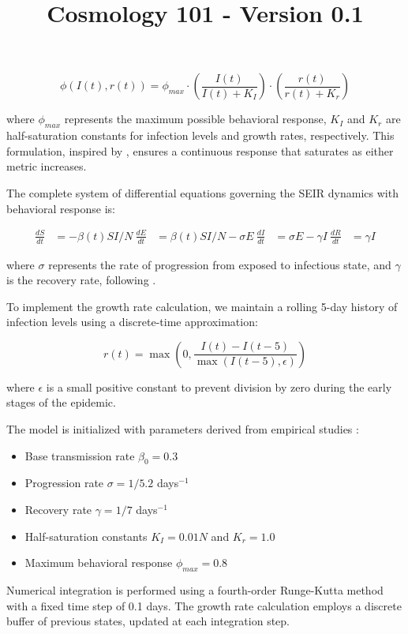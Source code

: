 \documentclass{article}\usepackage{graphicx} \usepackage{amsmath} \usepackage{colortbl}\title{Cosmology 101 - Version 0.1}
\begin{document}
\begin{equation}
\phi(I(t), r(t)) = \phi_{max} \cdot \left(\frac{I(t)}{I(t) + K_I}\right) \cdot \left(\frac{r(t)}{r(t) + K_r}\right)
\end{equation}

where $\phi_{max}$ represents the maximum possible behavioral response, $K_I$ and $K_r$ are half-saturation constants for infection levels and growth rates, respectively. This formulation, inspired by \cite{funk2010modelling}, ensures a continuous response that saturates as either metric increases.

The complete system of differential equations governing the SEIR dynamics with behavioral response is:

\begin{align}
\frac{dS}{dt} &= -\beta(t)SI/N \
\frac{dE}{dt} &= \beta(t)SI/N - \sigma E \
\frac{dI}{dt} &= \sigma E - \gamma I \
\frac{dR}{dt} &= \gamma I
\end{align}

where $\sigma$ represents the rate of progression from exposed to infectious state, and $\gamma$ is the recovery rate, following \cite{anderson1992infectious}.

To implement the growth rate calculation, we maintain a rolling 5-day history of infection levels using a discrete-time approximation:

\begin{equation}
r(t) = \max\left(0, \frac{I(t) - I(t-5)}{\max(I(t-5), \epsilon)}\right)
\end{equation}

where $\epsilon$ is a small positive constant to prevent division by zero during the early stages of the epidemic.

The model is initialized with parameters derived from empirical studies \cite{hethcote2000mathematics}:
\begin{itemize}
\item Base transmission rate $\beta_0 = 0.3$
\item Progression rate $\sigma = 1/5.2$ days$^{-1}$
\item Recovery rate $\gamma = 1/7$ days$^{-1}$
\item Half-saturation constants $K_I = 0.01N$ and $K_r = 1.0$
\item Maximum behavioral response $\phi_{max} = 0.8$
\end{itemize}

Numerical integration is performed using a fourth-order Runge-Kutta method with a fixed time step of 0.1 days. The growth rate calculation employs a discrete buffer of previous states, updated at each integration step.
\end{document}
